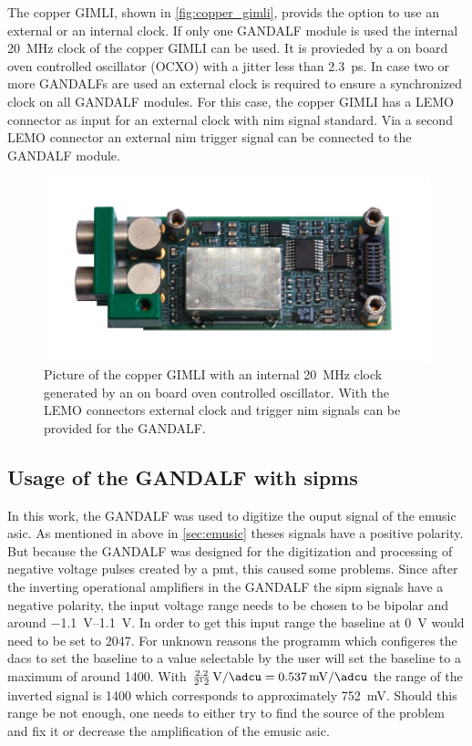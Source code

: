 The copper GIMLI, shown in \autoref{fig:copper_gimli}, provids the option to use an external or an internal clock.
If only one GANDALF module is used the internal \SI{20}{\mega\hertz} clock of the copper GIMLI can be used.
It is provieded by a on board oven controlled oscillator (OCXO) with a jitter less than \SI{2.3}{\pico\second}.
In case two or more GANDALFs are used an external clock is required to ensure a synchronized clock on all GANDALF modules.
For this case, the copper GIMLI has a LEMO connector as input for an external clock with \ac{nim} signal standard.
Via a second LEMO connector an external \ac{nim} trigger signal can be connected to the GANDALF module.

\begin{figure}
	\centering
	\includegraphics[width=.5\textwidth]{pictures/copper_gimli.png}
	\caption[Copper GIMLI]{Picture of the copper GIMLI with an internal \SI{20}{\mega\hertz} clock generated by an on board oven controlled oscillator. With the LEMO connectors external clock and trigger \ac{nim} signals can be provided for the GANDALF.}
	\label{fig:copper_gimli}
\end{figure}



\subsection{Usage of the GANDALF with \acp{sipm}}
In this work, the GANDALF was used to digitize the ouput signal of the \ac{emusic} \ac{asic}.
As mentioned in above in \autoref{sec:emusic} theses signals have a positive polarity.
But because the GANDALF was designed for the digitization and processing of negative voltage pulses created by a \ac{pmt}, this caused some problems.
Since after the inverting operational amplifiers in the GANDALF the \ac{sipm} signals have a negative polarity, the input voltage range needs to be chosen to be bipolar and around \SIrange{-1.1}{1.1}{\volt}.
In order to get this input range the baseline at \SI{0}{\volt} would need to be set to \SI{2047}{\adcu}.
For unknown reasons the programm which configeres the \acp{dac} to set the baseline to a \si{\adcu} value selectable by the user will set the baseline to a maximum of around \SI{1400}{\adcu}.
With $\frac{2.2}{2^12}\,\si{\volt\per\adcu} = \SI{0.537}{\milli\volt\per\adcu}$ the range of the inverted signal is \SI{1400}{\adcu} which corresponds to approximately \SI{752}{\milli\volt}.
Should this range be not enough, one needs to either try to find the source of the problem and fix it or decrease the amplification of the \ac{emusic} \ac{asic}.

